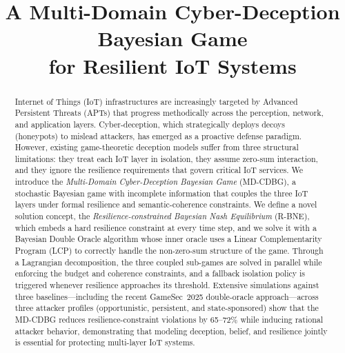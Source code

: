 \documentclass[conference]{IEEEtran}
\begin{document}
\title{A Multi-Domain Cyber-Deception Bayesian Game\\
for Resilient IoT Systems}

\author{
\and
{}
\and
{}
\and
{}
}

\maketitle

\pagestyle{plain}
\thispagestyle{plain}

\begin{abstract}
Internet of Things (IoT) infrastructures are increasingly targeted by
Advanced Persistent Threats (APTs) that progress methodically across the
perception, network, and application layers. Cyber-deception, which
strategically deploys decoys (honeypots) to mislead attackers, has emerged
as a proactive defense paradigm. However, existing game-theoretic deception
models suffer from three structural limitations: they treat each IoT layer in
isolation, they assume zero-sum interaction, and they ignore the resilience
requirements that govern critical IoT services. We introduce the
\emph{Multi-Domain Cyber-Deception Bayesian Game} (MD-CDBG), a stochastic
Bayesian game with incomplete information that couples the three IoT layers
under formal resilience and semantic-coherence constraints. We define a novel
solution concept, the \emph{Resilience-constrained Bayesian Nash Equilibrium}
(R-BNE), which embeds a hard resilience constraint at every time step, and we
solve it with a Bayesian Double Oracle algorithm whose inner oracle uses a
Linear Complementarity Program (LCP) to correctly handle the non-zero-sum
structure of the game. Through a Lagrangian decomposition, the three coupled
sub-games are solved in parallel while enforcing the budget and coherence
constraints, and a fallback isolation policy is triggered whenever resilience
approaches its threshold. Extensive simulations against three
baselines---including the recent GameSec~2025 double-oracle approach---across
three attacker profiles
(opportunistic, persistent, and state-sponsored) show that the MD-CDBG reduces
resilience-constraint violations by 65--72\% while inducing rational attacker
behavior, demonstrating that modeling deception, belief, and resilience jointly
is essential for protecting multi-layer IoT systems.
\end{abstract}
\end{document}
